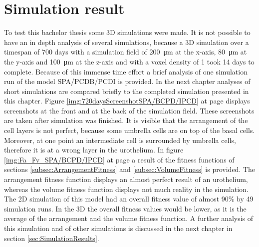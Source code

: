 \section{Simulation result}
To test this bachelor thesis some 3D simulations were made. It is not possible to have an in depth analysis of several simulations, because a 3D simulation over a timespan of 700 days with a simulation field of \SI{200}{\micro\metre} at the x-axis, \SI{80}{\micro\metre} at the y-axis and \SI{100}{\micro\metre} at the z-axis and with a voxel density of 1 took 14 days to complete. Because of this immense time effort a brief analysis of one simulation run of the model SPA/PCDB/PCDI is provided. In the next chapter analyses of short simulations are compared briefly to the completed simulation presented in this chapter. \newline
Figure \ref{img:720daysScreenshotSPA/BCPD/IPCD} at page \pageref{img:720daysScreenshotSPA/BCPD/IPCD} displays screenshots at the front and at the back of the simulation field. These screenshots are taken after simulation was finished. It is visible that the arrangement of the cell layers is not perfect, because some umbrella cells are on top of the basal cells. Moreover, at one point an intermediate cell is surrounded by umbrella cells, therefore it is at a wrong layer in the urothelium. \newline
In figure \ref{img:Fa_Fv_SPA/BCPD/IPCD} at page \pageref{img:Fa_Fv_SPA/BCPD/IPCD} a result of the fitness functions of sections \ref{subsec:ArrangementFitness} and \ref{subsec:VolumeFitness} is provided. The arrangement fitness function displays an almost perfect result of an urothelium, whereas the volume fitness function displays not much reality in the simulation. The 2D simulation of this model had an overall fitness value of almost 90\% by 49 simulation runs. In the 3D the overall fitness values would be lower, as it is the average of the arrangement and the volume fitness function.
A further analysis of this simulation and of other simulations is discussed in the next chapter in section \ref{sec:SimulationResults}.

